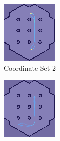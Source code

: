 \documentclass[%
paper=A4,               %
twoside=true,           %
openright,              %
11pt,                   %
bibliography=totoc,     %
titlepage=on,           %
DIV=12,                 %
BCOR=1.5cm,             %
parskip=half,            %
final
]{scrreprt}
\begin{document}
\begin{figure}[H]
\begin{subfigure}[b]{0.45\textwidth}
			\includegraphics[width=\textwidth]{Graphics/heatmapsim2.png}
			\caption{Coordinate Set 2}
			\label{fig:fig11}
		\end{subfigure}
		\vfill
		\begin{subfigure}[b]{0.45\textwidth}
			\centering
			\includegraphics[width=\textwidth]{Graphics/heatmapsim3.png}

\end{subfigure}
\end{figure}
\end{document}

